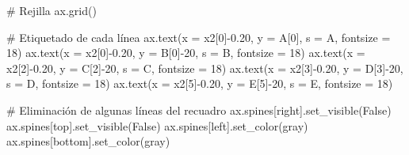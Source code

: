 \documentclass[
  letterpaper,
  DIV=11,
  numbers=noendperiod]{scrreprt}
\newenvironment{Shaded}{\begin{snugshade}}{\end{snugshade}}
\newcommand{\CommentTok}[1]{\textcolor[rgb]{0.37,0.37,0.37}{#1}}
\newcommand{\DecValTok}[1]{\textcolor[rgb]{0.68,0.00,0.00}{#1}}
\newcommand{\FloatTok}[1]{\textcolor[rgb]{0.68,0.00,0.00}{#1}}
\newcommand{\NormalTok}[1]{\textcolor[rgb]{0.00,0.23,0.31}{#1}}
\newcommand{\OperatorTok}[1]{\textcolor[rgb]{0.37,0.37,0.37}{#1}}
\newcommand{\StringTok}[1]{\textcolor[rgb]{0.13,0.47,0.30}{#1}}
\newcommand{\VariableTok}[1]{\textcolor[rgb]{0.07,0.07,0.07}{#1}}
\begin{document}
\begin{Shaded}
\begin{Highlighting}[]
\CommentTok{\# Rejilla}
\NormalTok{ax.grid()}

\CommentTok{\# Etiquetado de cada línea}
\NormalTok{ax.text(x }\OperatorTok{=}\NormalTok{ x2[}\DecValTok{0}\NormalTok{]}\OperatorTok{{-}}\FloatTok{0.20}\NormalTok{, y }\OperatorTok{=}\NormalTok{ A[}\DecValTok{0}\NormalTok{], s }\OperatorTok{=} \StringTok{\textquotesingle{}A\textquotesingle{}}\NormalTok{, fontsize }\OperatorTok{=} \DecValTok{18}\NormalTok{)}
\NormalTok{ax.text(x }\OperatorTok{=}\NormalTok{ x2[}\DecValTok{0}\NormalTok{]}\OperatorTok{{-}}\FloatTok{0.20}\NormalTok{, y }\OperatorTok{=}\NormalTok{ B[}\DecValTok{0}\NormalTok{]}\OperatorTok{{-}}\DecValTok{20}\NormalTok{, s }\OperatorTok{=} \StringTok{\textquotesingle{}B\textquotesingle{}}\NormalTok{, fontsize }\OperatorTok{=} \DecValTok{18}\NormalTok{)}
\NormalTok{ax.text(x }\OperatorTok{=}\NormalTok{ x2[}\DecValTok{2}\NormalTok{]}\OperatorTok{{-}}\FloatTok{0.20}\NormalTok{, y }\OperatorTok{=}\NormalTok{ C[}\DecValTok{2}\NormalTok{]}\OperatorTok{{-}}\DecValTok{20}\NormalTok{, s }\OperatorTok{=} \StringTok{\textquotesingle{}C\textquotesingle{}}\NormalTok{, fontsize }\OperatorTok{=} \DecValTok{18}\NormalTok{)}
\NormalTok{ax.text(x }\OperatorTok{=}\NormalTok{ x2[}\DecValTok{3}\NormalTok{]}\OperatorTok{{-}}\FloatTok{0.20}\NormalTok{, y }\OperatorTok{=}\NormalTok{ D[}\DecValTok{3}\NormalTok{]}\OperatorTok{{-}}\DecValTok{20}\NormalTok{, s }\OperatorTok{=} \StringTok{\textquotesingle{}D\textquotesingle{}}\NormalTok{, fontsize }\OperatorTok{=} \DecValTok{18}\NormalTok{)}
\NormalTok{ax.text(x }\OperatorTok{=}\NormalTok{ x2[}\DecValTok{5}\NormalTok{]}\OperatorTok{{-}}\FloatTok{0.20}\NormalTok{, y }\OperatorTok{=}\NormalTok{ E[}\DecValTok{5}\NormalTok{]}\OperatorTok{{-}}\DecValTok{20}\NormalTok{, s }\OperatorTok{=} \StringTok{\textquotesingle{}E\textquotesingle{}}\NormalTok{, fontsize }\OperatorTok{=} \DecValTok{18}\NormalTok{)}

\CommentTok{\# Eliminación de algunas líneas del recuadro}
\NormalTok{ax.spines[}\StringTok{\textquotesingle{}right\textquotesingle{}}\NormalTok{].set\_visible(}\VariableTok{False}\NormalTok{)}
\NormalTok{ax.spines[}\StringTok{\textquotesingle{}top\textquotesingle{}}\NormalTok{].set\_visible(}\VariableTok{False}\NormalTok{)}
\NormalTok{ax.spines[}\StringTok{\textquotesingle{}left\textquotesingle{}}\NormalTok{].set\_color(}\StringTok{\textquotesingle{}gray\textquotesingle{}}\NormalTok{)}
\NormalTok{ax.spines[}\StringTok{\textquotesingle{}bottom\textquotesingle{}}\NormalTok{].set\_color(}\StringTok{\textquotesingle{}gray\textquotesingle{}}\NormalTok{)}


\end{Highlighting}
\end{Shaded}
\end{document}
